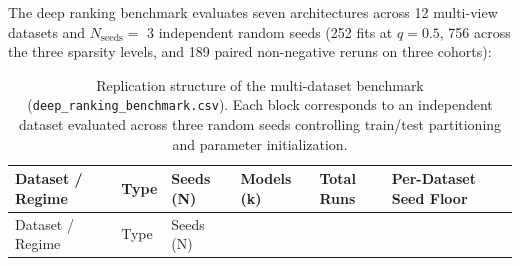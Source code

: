 \documentclass[
  10pt,
  letterpaper,
]{report}
\begin{document}
The deep ranking benchmark evaluates seven architectures across 12
multi-view datasets and \(N_{\text{seeds}} =\) 3 independent random
seeds (252 fits at \(q = 0.5\), 756 across the three sparsity levels,
and 189 paired non-negative reruns on three cohorts):

\begin{longtable}[]{@{}
  >{\raggedright\arraybackslash}p{}
  >{\raggedright\arraybackslash}p{}
  >{\raggedleft\arraybackslash}p{}
  >{\raggedleft\arraybackslash}p{}
  >{\raggedleft\arraybackslash}p{}
  >{\raggedleft\arraybackslash}p{}@{}}
\caption{Replication structure of the multi-dataset benchmark
(\protect\texttt{deep\_ranking\_benchmark.csv}). Each block corresponds
to an independent dataset evaluated across three random seeds
controlling train/test partitioning and parameter
initialization.}\label{tbl-replication-design}\tabularnewline
\toprule\noalign{}
\begin{minipage}[b]{\linewidth}\raggedright
Dataset / Regime
\end{minipage} & \begin{minipage}[b]{\linewidth}\raggedright
Type
\end{minipage} & \begin{minipage}[b]{\linewidth}\raggedleft
Seeds (N)
\end{minipage} & \begin{minipage}[b]{\linewidth}\raggedleft
Models (k)
\end{minipage} & \begin{minipage}[b]{\linewidth}\raggedleft
Total Runs
\end{minipage} & \begin{minipage}[b]{\linewidth}\raggedleft
Per-Dataset Seed Floor
\end{minipage} \\
\midrule\noalign{}
\endfirsthead
\toprule\noalign{}
\begin{minipage}[b]{\linewidth}\raggedright
Dataset / Regime
\end{minipage} & \begin{minipage}[b]{\linewidth}\raggedright
Type
\end{minipage} & \begin{minipage}[b]{\linewidth}\raggedleft
Seeds (N)
\end{minipage} & \begin{minipage}[b]{\linewidth}\raggedleft

\end{minipage}
\end{longtable}
\end{document}
